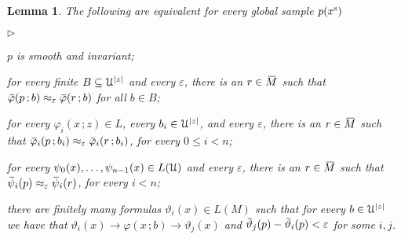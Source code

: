\documentclass[10pt,openany]{article}
\newcommand{\mylabel}[1]{{\ssf{#1}}\hfill}
\renewenvironment{itemize}
  {\begin{list}{$\triangleright$}{%
   \setlength{\parskip}{0mm}
   \setlength{\topsep}{.4\baselineskip}
   \setlength{\rightmargin}{0mm}
   \setlength{\listparindent}{0mm}
   \setlength{\itemindent}{0mm}
   \setlength{\labelwidth}{3ex}
   \setlength{\itemsep}{.4\baselineskip}
   \setlength{\parsep}{0mm}
   \setlength{\partopsep}{0mm}
   \setlength{\labelsep}{1ex}
   \setlength{\leftmargin}{\labelwidth+\labelsep}
   \let\makelabel\mylabel}}{%
   \end{list}\vspace*{-\parskip}
  }
\newcommand{\sbar}[1]{\mkern 3mu\overline{\mkern-3mu#1\mkern-1mu}\mkern 1mu}
\newcommand{\barM}{\mkern 4mu\overline{\mkern-4mu M\mkern-2mu}\mkern 2mu}
\def\imp{\rightarrow}
\def\U{\EuScript U}
\def\theta{\vartheta}
\def\phi{\varphi}
\def\epsilon{\varepsilon}
\def\ssf#1{\textsf{\small #1}}
\newcounter{thm}[section]
\theoremstyle{mio}
\newtheorem{lemma}[thm]{Lemma}
\theoremstyle{liscio}
\begin{document}
\begin{lemma}
  The following are equivalent for every global sample $p(x^{\rm s})$
  \begin{itemize}
    \item[1.] $p$ is smooth and invariant;
    \item[2.] for every finite $B\subseteq\U^{|z|}$ and every $\epsilon$, there is an $r\in \barM$ such that $\sbar\phi(p\,;b)\approx_\epsilon\sbar\phi(r\,;b)$ for all $b\in B$;
    \item[2.] for every $\phi_i(x\,;z)\in L$, every $b_i\in\U^{|z|}$, and every $\epsilon$, there is an $r\in \barM$ such that $\sbar\phi_i(p\,;b_i)\approx_\epsilon\sbar\phi_i(r\,;b_i)$, for every $0\le i<n$;
    \item[2.] for every $\psi_0(x),\dots,\psi_{n-1}(x)\in L(\U)$ and every $\epsilon$, there is an $r\in \barM$ such that $\sbar\psi_i(p)\approx_\epsilon\sbar\psi_i(r)$, for every $i<n$;
    \item[4.] there are finitely many formulas $\theta_i(x)\in L(M)$ such that for every $b\in\U^{|z|}$ we have that $\theta_i(x)\imp\phi(x\,;b)\imp\theta_j(x)$ and $\sbar\theta_j(p)-\sbar\theta_i(p)<\epsilon$ for some $i,j$.
  \end{itemize}
\end{lemma}
\end{document}
